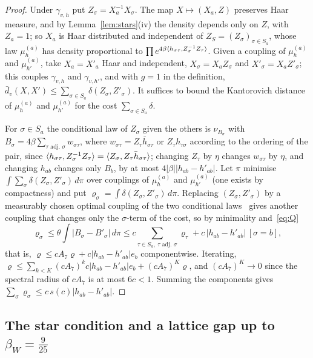 \begin{proof}
Under $\gamma_{v,h}$ put $Z_\sigma=X_a^{-1}X_\sigma$. The map $X\mapsto(X_a,Z)$
preserves Haar measure, and by Lemma~\ref{lem:stars}(iv) the density depends
only on $Z$, with $Z_a=1$; so $X_a$ is Haar distributed and independent of
$Z_S=(Z_\sigma)_{\sigma\in S_a}$, whose law $\mu^{(a)}_h$ has density
proportional to $\prod e^{4\beta\langle h_{\sigma\tau},Z_\sigma^{-1}Z_\tau\rangle}$. Given
a coupling of $\mu^{(a)}_h$ and $\mu^{(a)}_{h'}$, take $X_a=X'_a$ Haar and
independent, $X_\sigma=X_aZ_\sigma$ and $X'_\sigma=X_aZ'_\sigma$; this couples
$\gamma_{v,h}$ and $\gamma_{v,h'}$, and with $g=1$ in the definition,
$\bar d_v(X,X')\le\sum_{\sigma\in S_a}\delta(Z_\sigma,Z'_\sigma)$. It suffices
to bound the Kantorovich distance of $\mu^{(a)}_h$ and $\mu^{(a)}_{h'}$ for the
cost $\sum_{\sigma\in S_a}\delta$.

For $\sigma\in S_a$ the conditional law of $Z_\sigma$ given the others is
$\nu_{B_\sigma}$ with $B_\sigma=4\beta\sum_{\tau\text{ adj.\ }\sigma}w_{\sigma\tau}$,
where $w_{\sigma\tau}=Z_\tau\bar h_{\sigma\tau}$ or $Z_\tau h_{\tau\sigma}$
according to the ordering of the pair, since $\langle h_{\sigma\tau},Z_\sigma^{-1}
Z_\tau\rangle=\langle Z_\sigma,Z_\tau\bar h_{\sigma\tau}\rangle$; changing $Z_\tau$ by $\eta$
changes $w_{\sigma\tau}$ by $\eta$, and changing $h_{ab}$ changes only $B_b$, by
at most $4|\beta||h_{ab}-h'_{ab}|$. Let $\pi$ minimise
$\int\sum_\sigma\delta(Z_\sigma,Z'_\sigma)\,d\pi$ over couplings of
$\mu^{(a)}_h$ and $\mu^{(a)}_{h'}$ (one exists by compactness) and put
$\varrho_\sigma=\int\delta(Z_\sigma,Z'_\sigma)\,d\pi$. Replacing
$(Z_\sigma,Z'_\sigma)$ by a measurably chosen optimal coupling of the two
conditional laws~\cite[Cor.~5.22]{Vil09} gives another coupling that changes
only the $\sigma$-term of the cost, so by minimality and~\eqref{eq:Q}
\[
\varrho_\sigma\le\theta\int|B_\sigma-B'_\sigma|\,d\pi\le c\sum_{\tau\in S_a,\
\tau\text{ adj.\ }\sigma}\varrho_\tau+c\,|h_{ab}-h'_{ab}|\,[\sigma=b],
\]
that is, $\varrho\le cA_7\varrho+c|h_{ab}-h'_{ab}|e_b$ componentwise. Iterating,
$\varrho\le\sum_{k<K}(cA_7)^kc|h_{ab}-h'_{ab}|e_b+(cA_7)^K\varrho$, and
$(cA_7)^K\to0$ since the spectral radius of $cA_7$ is at most $6c<1$.
Summing the components gives $\sum_\sigma\varrho_\sigma\le c\,s(c)|h_{ab}-
h'_{ab}|$.
\end{proof}

\subsection{The star condition and a lattice gap up to \texorpdfstring{$\beta_W=\frac9{25}$}{beta\_W=9/25}}

